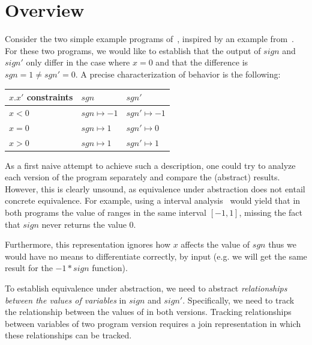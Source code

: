 \section{Overview}



Consider the two simple example programs of~, inspired by an example from~\cite{MauborgneRival07}. For these two programs, we would like to establish that the output of $sign$ and $sign'$ only differ in the case where $x=0$ and that the difference is $sgn = 1 \neq sgn' = 0$. A precise characterization of behavior is the following:

\vspace{0.1in}
{\footnotesize
\begin{tabular}{l|l|l}
$x.x'$ constraints  & $sgn$             & $sgn'$
\\ \hline
$x < 0$             & $sgn \mapsto -1$  & $sgn' \mapsto -1$
\\ \hline
$x = 0$             & $sgn \mapsto 1$  & $sgn' \mapsto 0$
\\ \hline
$x > 0$             & $sgn \mapsto 1$  & $sgn' \mapsto 1$
\end{tabular}
}


As a first naive attempt to achieve such a description, one could try to analyze each version of the program separately and compare the (abstract) results. However, this is clearly unsound, as equivalence under abstraction does not entail concrete equivalence. For example, using a interval analysis~\cite{CousotHalbwachs78} would yield that in both programs the value of  ranges in the same interval $[-1,1]$, missing the fact that $sign$ never returns the value $0$.


Furthermore, this representation ignores how $x$ affects the value of $sgn$ thus we would have no means to differentiate correctly, by input (e.g. we will get the same result for the $-1 * sign$ function).

To establish equivalence under abstraction, we need to abstract \emph{relationships between the values of variables} in $sign$ and $sign'$. Specifically, we need to track the relationship between the values of  in both versions. Tracking relationships between variables of two program version requires a join representation in which these relationships can be tracked.

